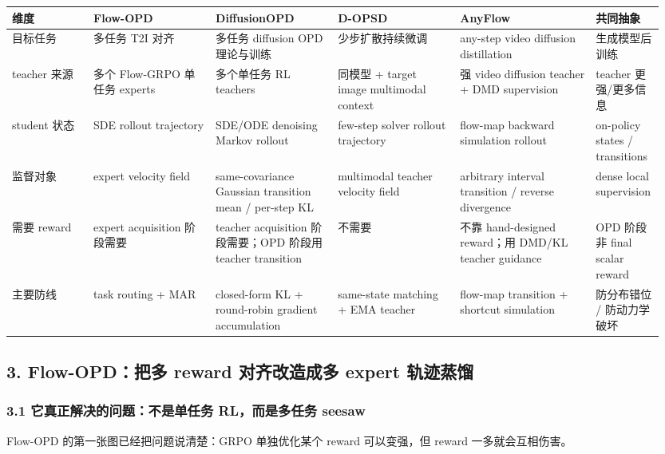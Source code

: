 \begin{center}
\scriptsize
\setlength{\tabcolsep}{2pt}
\begin{tabular}{p{0.12\linewidth}p{0.18\linewidth}p{0.18\linewidth}p{0.18\linewidth}p{0.20\linewidth}p{0.09\linewidth}}
\toprule
\textbf{维度} & \textbf{Flow-OPD} & \textbf{DiffusionOPD} & \textbf{D-OPSD} & \textbf{AnyFlow} & \textbf{共同抽象}\\
\midrule
目标任务 & 多任务 T2I 对齐 & 多任务 diffusion OPD 理论与训练 & 少步扩散持续微调 & any-step video diffusion distillation & 生成模型后训练\\
teacher 来源 & 多个 Flow-GRPO 单任务 experts & 多个单任务 RL teachers & 同模型 + target image multimodal context & 强 video diffusion teacher + DMD supervision & teacher 更强/更多信息\\
student 状态 & SDE rollout trajectory & SDE/ODE denoising Markov rollout & few-step solver rollout trajectory & flow-map backward simulation rollout & on-policy states / transitions\\
监督对象 & expert velocity field & same-covariance Gaussian transition mean / per-step KL & multimodal teacher velocity field & arbitrary interval transition / reverse divergence & dense local supervision\\
需要 reward & expert acquisition 阶段需要 & teacher acquisition 阶段需要；OPD 阶段用 teacher transition & 不需要 & 不靠 hand-designed reward；用 DMD/KL teacher guidance & OPD 阶段非 final scalar reward\\
主要防线 & task routing + MAR & closed-form KL + round-robin gradient accumulation & same-state matching + EMA teacher & flow-map transition + shortcut simulation & 防分布错位 / 防动力学破坏\\
\bottomrule
\end{tabular}
\end{center}

\subsection{3. Flow-OPD：把多 reward 对齐改造成多 expert 轨迹蒸馏}

\subsubsection{3.1 它真正解决的问题：不是单任务 RL，而是多任务 seesaw}

Flow-OPD 的第一张图已经把问题说清楚：GRPO 单独优化某个 reward 可以变强，但 reward 一多就会互相伤害。

